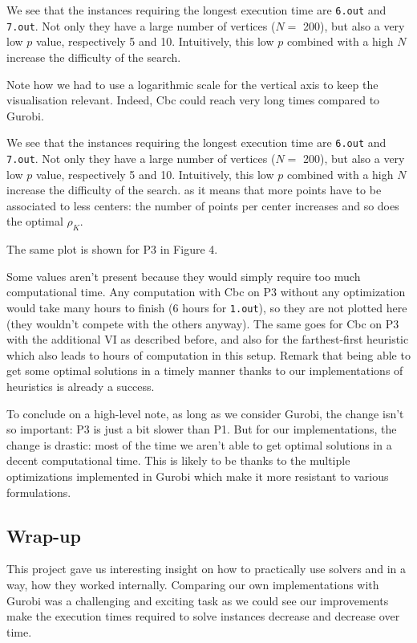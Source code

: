 \documentclass[a4paper,10pt]{article}
\begin{document}
We see that the instances requiring the longest execution time are \texttt{6.out} and \texttt{7.out}. Not only they have a large number of vertices ($N = $ 200), but also a very low $p$ value, respectively 5 and 10. Intuitively, this low $p$ combined with a high $N$ increase the difficulty of the search.


    Note how we had to use a logarithmic scale for the vertical axis to keep the visualisation relevant. Indeed, Cbc could reach very long times compared to Gurobi.

    We see that the instances requiring the longest execution time are \texttt{6.out} and \texttt{7.out}. Not only they have a large number of vertices ($N = $ 200), but also a very low $p$ value, respectively 5 and 10. Intuitively, this low $p$ combined with a high $N$ increase the difficulty of the search. as it means that more points have to be associated to less centers: the number of points per center increases and so does the optimal $\rho_K$.
	
	
\pagebreak

The same plot is shown for P3 in Figure 4.


Some values aren't present because they would simply require too much computational time. Any computation with Cbc on P3 without any optimization would take many hours to finish (6 hours for \texttt{1.out}), so they are not plotted here (they wouldn't compete with the others anyway). The same goes for Cbc on P3 with the additional VI as described before, and also for the farthest-first heuristic which also leads to hours of computation in this setup. Remark that being able to get some optimal solutions in a timely manner thanks to our implementations of heuristics is already a success.

To conclude on a high-level note, as long as we consider Gurobi, the change isn't so important: P3 is just a bit slower than P1. But for our implementations, the change is drastic: most of the time we aren't able to get optimal solutions in a decent computational time. This is likely to be thanks to the multiple optimizations implemented in Gurobi which make it more resistant to various formulations.



	\subsection{Wrap-up}
	This project gave us interesting insight on how to practically use solvers  and  in a way, how they worked internally. Comparing our own implementations with Gurobi was a challenging and exciting task as we could see our improvements make the execution times required to solve instances decrease and decrease over time.
	
\end{document}
